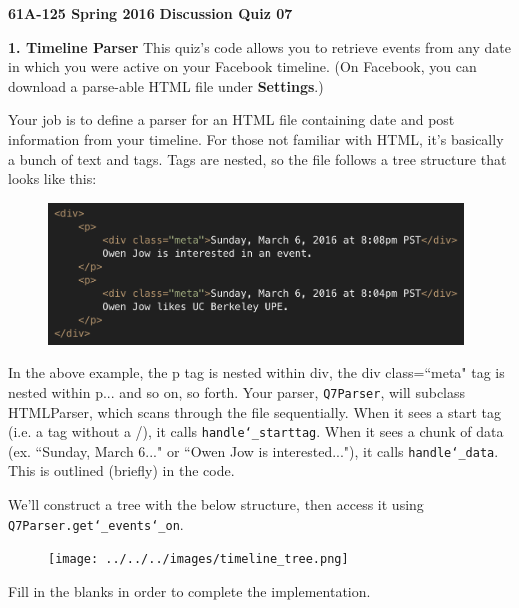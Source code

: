 \documentclass[11pt]{article}
\begin{document}
\textbf{61A-125 Spring 2016}\newline
\textbf{Discussion Quiz 07}\newline

\textbf{1. Timeline Parser}\newline
This quiz's code allows you to retrieve events from any date in which you were active on your Facebook timeline. (On Facebook, you can download a parse-able HTML file under \textbf{Settings}.)
\newline

Your job is to define a parser for an HTML file containing date and post information from your timeline. For those not familiar with HTML, it's basically a bunch of text and tags. Tags are nested, so the file follows a tree structure that looks like this:
\begin{figure}[ht!]
\includegraphics[width=110mm]{../../../images/html_example.png}
\end{figure}

In the above example, the \textlangle{}p\textrangle{} tag is nested within \textlangle{}div\textrangle{}, the \textlangle{}div class=``meta"\textrangle{} tag is nested within \textlangle{}p\textrangle{}... and so on, so forth. Your parser, \texttt{Q7Parser}, will subclass HTMLParser, which scans through the file sequentially. When it sees a start tag (i.e. a tag without a /), it calls \texttt{handle\char`_starttag}. When it sees a chunk of data (ex. ``Sunday, March 6..." or ``Owen Jow is interested..."), it calls \texttt{handle\char`_data}. This is outlined (briefly) in the code.
\newline

We'll construct a tree with the below structure, then access it using \texttt{Q7Parser.get\char`_events\char`_on}.

\begin{figure}[ht!]
\texttt{[image: ../../../images/timeline\_tree.png]}
\end{figure}

Fill in the blanks in order to complete the implementation.
\end{document}
